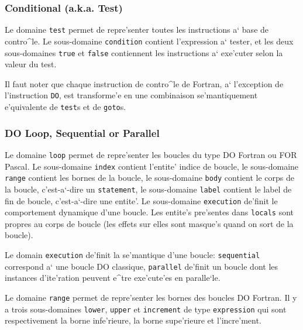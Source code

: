 \subsubsection{Conditional (a.k.a. Test)}
\label{subsubsection-test}

{
Le domaine \verb/test/ permet de repre'senter toutes les instructions a` base
de contro^le. Le sous-domaine \verb/condition/ contient l'expression a`
tester, et les deux sous-domaines \verb/true/ et \verb/false/ contiennent les
instructions a` exe'cuter selon la valeur du test. 

Il faut noter que chaque instruction de contro^le de Fortran,
a` l'exception de l'instruction \verb/DO/, est
transforme'e en une combinaison se'mantiquement e'quivalente de \verb/test/s
et de \verb/goto/s.
}

\subsubsection{DO Loop, Sequential or Parallel}
\label{subsubsection-loop}

{
Le domaine \verb/loop/ permet de repre'senter les boucles du type DO Fortran
ou FOR Pascal. Le sous-domaine \verb/index/ contient l'entite' indice de
boucle, le sous-domaine \verb/range/ contient les bornes de la boucle, le
sous-domaine \verb/body/ contient le corps de la boucle, c'est-a`-dire un
\verb/statement/, le sous-domaine \verb/label/ contient le label de fin de boucle,
c'est-a`-dire une entite'. Le sous-domaine \verb/execution/ de'finit le
comportement dynamique d'une boucle. Les entite's pre'sentes dans
\verb/locals/ sont propres au corps de boucle (les effets sur elles sont
masque's quand on sort de la boucle).
}

{
Le domain \verb/execution/ de'finit la se'mantique d'une boucle:
\verb/sequential/ correspond a` une boucle DO classique, \verb/parallel/
de'finit un boucle dont les instances d'ite'ration peuvent e^tre
exe'cute'es en paralle`le.
}

\label{range}
{
Le domaine \verb/range/ permet de repre'senter les bornes des boucles DO
Fortran. Il y a trois sous-domaines \verb/lower/, \verb/upper/ et \verb/increment/ de
type \verb/expression/ qui sont respectivement la borne infe'rieure, la borne
supe'rieure et l'incre'ment.
}

